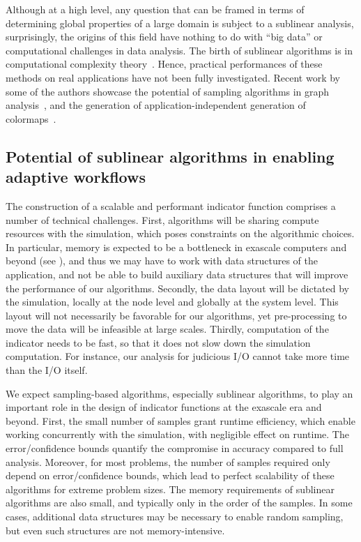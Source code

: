 \documentclass[final]{siamltex}
\begin{document}
Although at a high level, any question that can be framed in terms of determining global properties of a large domain is 
subject to a sublinear analysis, surprisingly, the origins of this field
have nothing to do with ``big data'' or computational challenges in data analysis. 
The birth of sublinear algorithms is in computational complexity theory~\cite{RS96}.
Hence, practical performances of  these methods on real applications have not been fully investigated. 
Recent work by some of the authors showcase the potential of sampling algorithms in graph
analysis~\cite{SePiKo13, SePiKo14, KoPiPlSe13, JhSePi13, JhSePi15,BaKo15}, and the generation of application-independent
generation of colormaps~\cite{TBSP13}.

\subsection{Potential of sublinear algorithms in enabling adaptive workflows}
The construction of a scalable and performant indicator function comprises a
number of technical challenges. First, algorithms will be sharing compute 
resources with the simulation, which poses constraints on the algorithmic choices. 
In particular, memory is expected to be a bottleneck in exascale computers 
and beyond (see ), and thus we may have to work with data 
structures of the application, and not be able to build auxiliary data 
structures that will improve the performance of our algorithms. Secondly, the 
data layout will be dictated by the simulation, locally at the node level 
and globally at the system level. This layout will not necessarily be favorable 
for our algorithms, yet pre-processing to move the data will be infeasible at 
large scales.  Thirdly,  computation of the indicator needs to be fast, so that it does not  
slow down  the simulation computation.  For instance,   our analysis for judicious I/O   
cannot take more time than the I/O itself.  

We expect sampling-based algorithms, especially sublinear algorithms, to play an 
important role in the design of indicator functions at the  exascale era and beyond.  First, 
the small number of samples grant runtime efficiency, which enable working 
concurrently with the simulation, with  negligible effect on runtime.  
The error/confidence bounds quantify the  compromise in accuracy compared to full analysis. Moreover, for most 
problems, the number of samples required only depend on  error/confidence bounds, 
which lead to perfect scalability of these algorithms for extreme problem sizes. The memory 
requirements of  sublinear algorithms are also  small, and typically  only in the 
order of the samples.  In some cases,  additional data structures may be necessary 
to enable random sampling,  but even  such structures are not memory-intensive. 
\end{document}
